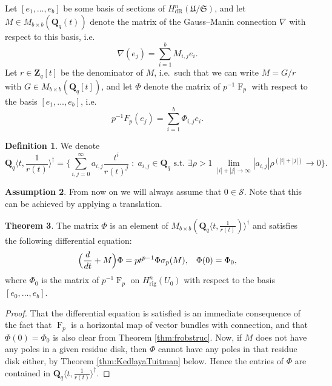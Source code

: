 \documentclass[a4paper,11pt]{article}
\numberwithin{equation}{section}
\newcommand{\ZZ}{\mathbf{Z}} %
\newcommand{\QQ}{\mathbf{Q}} %
\DeclareMathOperator{\Frob}{F}           %
\providecommand{\HdR}{H_{\text{dR}}}    %
\providecommand{\Hrig}{H_{\text{rig}}}  %
\theoremstyle{definition}
\newtheorem{thm}{Theorem}[section]
\newtheorem{defn}[thm]{Definition}
\newtheorem{assump}[thm]{Assumption}
\begin{document}
Let $[e_1, \ldots, e_b]$ be some basis of sections of $\HdR^n(\mathfrak{U}/\mathfrak{S})$, and let 
$M \in M_{b \times b}(\QQ_q(t))$ denote the matrix of the Gauss--Manin connection $\nabla$ with respect 
to this basis, i.e.\ 
\[
\nabla (e_j) = \sum_{i=1}^b M_{i,j} e_i.
\]
Let $r \in \ZZ_q[t]$ be the denominator of $M$, i.e.\ such that we can write $M=G/r$ with $G \in M_{b \times b}(\QQ_q[t])$, 
and let $\Phi$ denote the matrix of $p^{-1}\Frob_p$ with respect to the basis $[e_1, \ldots, e_b]$, i.e.\
\[
p^{-1} F_p (e_j) = \sum_{i=1}^b \Phi_{i,j} e_i.
\]

\begin{defn} We denote
\[
\QQ_q \langle t, \frac{1}{r(t)} \rangle^{\dag} = 
\biggl\{\sum_{i,j=0}^{\infty} a_{i,j} \frac{t^i}{r(t)^j} \; : \; 
a_{i,j} \in \QQ_q \text{ s.t. } \exists \rho > 1 \; 
\lim_{|i|+|j| \rightarrow \infty} |a_{i,j}| \rho^{(|i|+|j|)} \rightarrow 0 
\biggr\}.
\] 
\end{defn}

\begin{assump}
From now on we will always assume that $0 \in \mathcal{S}$. 
Note that this can be achieved by applying a translation.
\end{assump}

\begin{thm} \label{thm:eqphi} The matrix $\Phi$ is an element of $M_{b \times b}(\QQ_q \langle t, \frac{1}{r(t)}) \rangle^{\dag}$ 
and satisfies the following differential equation:
\begin{equation*}
\Bigl(\frac{d}{dt} + M\Bigr) \Phi = p t^{p-1} \Phi \sigma_p(M), \; \; \; \Phi(0)=\Phi_0,
\end{equation*}
where $\Phi_0$ is the matrix of $p^{-1}\Frob_p$ on $\Hrig^n(U_0)$ with respect to the basis
$[e_0,\ldots,e_b]$.
\end{thm}

\begin{proof}
That the differential equation is satisfied is an immediate consequence of the fact that $\Frob_p$ is a
horizontal map of vector bundles with connection, and that $\Phi(0)=\Phi_0$ is also clear from Theorem
\ref{thm:frobstruc}. Now, if $M$ does not have any poles in a given residue disk, then $\Phi$ cannot have 
any poles in that residue disk either, by Theorem \ref{thm:KedlayaTuitman} below. Hence the entries 
of $\Phi$ are contained in $\QQ_q \langle t, \frac{1}{r(t)} \rangle^{\dag}$.
\end{proof}
\end{document}
